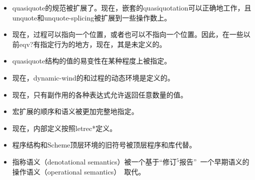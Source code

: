 \begin{itemize}
\item {\cf quasiquote}的规范被扩展了。现在，嵌套的quasiquotation可以正确地工作，且{\cf unquote}和{\cf unquote-splicing}被扩展到一些操作数上。
\item 现在，过程可以指向一个位置，或者也可以不指向一个位置。因此，在一些以前{\cf eqv?}有指定行为的地方，现在，其是未定义的。
\item {\cf quasiquote}结构的值的易变性在某种程度上被指定。
\item 现在，{\cf dynamic-wind}的和过程的动态环境是定义的。
\item 现在，只有副作用的各种表达式允许返回任意数量的值。
\item 宏扩展的顺序和语义被更加完整地指定。
\item 现在，内部定义按照{\cf letrec*}定义。
\item 程序结构和Scheme顶层环境的旧符号被顶层程序和库代替。
\item 指称语义（denotational semantics）被一个基于“修订$^5$报告”~\cite{R5RS}一个早期语义的操作语义（operational semantics）~\cite{mf:scheme-op-sem}取代。
\end{itemize}


